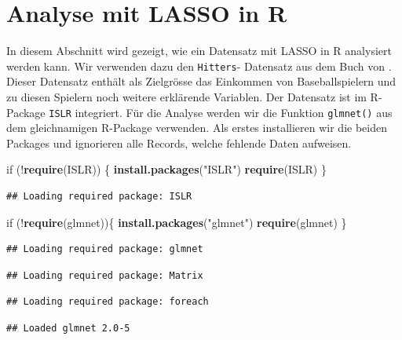 \documentclass[]{book}
\newenvironment{Shaded}{\begin{snugshade}}{\end{snugshade}}
\newcommand{\KeywordTok}[1]{\textcolor[rgb]{0.13,0.29,0.53}{\textbf{{#1}}}}
\newcommand{\StringTok}[1]{\textcolor[rgb]{0.31,0.60,0.02}{{#1}}}
\newcommand{\NormalTok}[1]{{#1}}
\begin{document}
\section{Analyse mit LASSO in R}\label{analyse-mit-lasso-in-r}

In diesem Abschnitt wird gezeigt, wie ein Datensatz mit LASSO in R
analysiert werden kann. Wir verwenden dazu den \texttt{Hitters}-
Datensatz aus dem Buch von \citet{JWHT2013}. Dieser Datensatz enthält
als Zielgrösse das Einkommen von Baseballspielern und zu diesen Spielern
noch weitere erklärende Variablen. Der Datensatz ist im R-Package
\texttt{ISLR} integriert. Für die Analyse werden wir die Funktion
\texttt{glmnet()} aus dem gleichnamigen R-Package verwenden. Als erstes
installieren wir die beiden Packages und ignorieren alle Records, welche
fehlende Daten aufweisen.

\begin{Shaded}
\begin{Highlighting}[]
\NormalTok{if (!}\KeywordTok{require}\NormalTok{(ISLR)) \{}
  \KeywordTok{install.packages}\NormalTok{(}\StringTok{"ISLR"}\NormalTok{)}
  \KeywordTok{require}\NormalTok{(ISLR)}
\NormalTok{\}}
\end{Highlighting}
\end{Shaded}

\begin{verbatim}
## Loading required package: ISLR
\end{verbatim}

\begin{Shaded}
\begin{Highlighting}[]
\NormalTok{if (!}\KeywordTok{require}\NormalTok{(glmnet))\{}
  \KeywordTok{install.packages}\NormalTok{(}\StringTok{"glmnet"}\NormalTok{)}
  \KeywordTok{require}\NormalTok{(glmnet)}
\NormalTok{\}}
\end{Highlighting}
\end{Shaded}

\begin{verbatim}
## Loading required package: glmnet
\end{verbatim}

\begin{verbatim}
## Loading required package: Matrix
\end{verbatim}

\begin{verbatim}
## Loading required package: foreach
\end{verbatim}

\begin{verbatim}
## Loaded glmnet 2.0-5
\end{verbatim}
\end{document}
